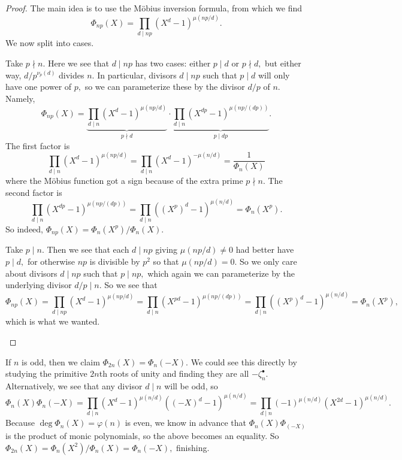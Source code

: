 \begin{proof}
	The main idea is to use the M\"obius inversion formula, from which we find
	\[\Phi_{np}(X)=\prod_{d\mid np}\left(X^d-1\right)^{\mu(np/d)}.\]
	We now split into cases.
	\begin{listalph}
		\item Take $p\nmid n.$ Here we see that $d\mid np$ has two cases: either $p\mid d$ or $p\nmid d,$ but either way, $d/p^{\nu_p(d)}$ divides $n.$ In particular, divisors $d\mid np$ such that $p\mid d$ will only have one power of $p,$ so we can parameterize these by the divisor $d/p$ of $n.$ Namely,
		\[\Phi_{np}(X)=\underbrace{\prod_{d\mid n}\left(X^d-1\right)^{\mu(np/d)}}_{p\nmid d}\cdot\underbrace{\prod_{d\mid n}\left(X^{dp}-1\right)^{\mu(np/(dp))}}_{p\mid dp}.\]
		The first factor is
		\[\prod_{d\mid n}\left(X^d-1\right)^{\mu(np/d)}=\prod_{d\mid n}\left(X^d-1\right)^{-\mu(n/d)}=\frac1{\Phi_n(X)}\]
		where the M\"obius function got a sign because of the extra prime $p\nmid n.$ The second factor is
		\[\prod_{d\mid n}\left(X^{dp}-1\right)^{\mu(np/(dp))}=\prod_{d\mid n}\left(\left(X^p\right)^d-1\right)^{\mu(n/d)}=\Phi_n\left(X^p\right).\]
		So indeed, $\Phi_{np}(X)=\Phi_n\left(X^p\right)/\Phi_n(X).$
		\item Take $p\mid n.$ Then we see that each $d\mid np$ giving $\mu(np/d)\ne0$ had better have $p\mid d,$ for otherwise $np$ is divisible by $p^2$ so that $\mu(np/d)=0.$ So we only care about divisors $d\mid np$ such that $p\mid np,$ which again we can parameterize by the underlying divisor $d/p\mid n.$ So we see that
		\[\Phi_{np}(X)=\prod_{d\mid np}\left(X^d-1\right)^{\mu(np/d)}=\prod_{d\mid n}\left(X^{pd}-1\right)^{\mu(np/(dp))}=\prod_{d\mid n}\left(\left(X^p\right)^d-1\right)^{\mu(n/d)}=\Phi_n\left(X^p\right),\]
		which is what we wanted.
		\qedhere
	\end{listalph}
\end{proof}
\begin{example}
	If $n$ is odd, then we claim $\Phi_{2n}(X)=\Phi_n(-X).$ We could see this directly by studying the primitive $2n$th roots of unity and finding they are all $-\zeta_n^\bullet.$ Alternatively, we see that any divisor $d\mid n$ will be odd, so
	\[\Phi_n(X)\Phi_n(-X)=\prod_{d\mid n}\left(X^d-1\right)^{\mu(n/d)}\left((-X)^d-1\right)^{\mu(n/d)}=\prod_{d\mid n}(-1)^{\mu(n/d)}\left(X^{2d}-1\right)^{\mu(n/d)}.\]
	Because $\deg\Phi_n(X)=\varphi(n)$ is even, we know in advance that $\Phi_n(X)\Phi_(-X)$ is the product of monic polynomials, so the above becomes an equality. So $\Phi_{2n}(X)=\Phi_n\left(X^2\right)/\Phi_n(X)=\Phi_n(-X),$ finishing.
\end{example}
